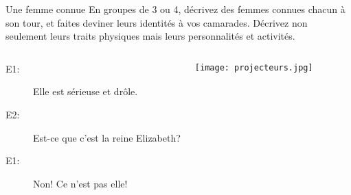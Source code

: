 \documentclass{beamer}
\begin{document}
  \begin{frame}{Une femme connue}
    En groupes de 3 ou 4, décrivez des femmes connues chacun à son tour, et faites deviner leurs identités à vos camarades. Décrivez non seulement leurs traits physiques mais leurs personnalités et activités. \\
    \begin{columns}
        \begin{description}
          \item[E1:] Elle est sérieuse et drôle.
          \item[] 
          \item[E2:] Est-ce que c'est la reine Elizabeth?
          \item[] 
          \item[E1:] Non! Ce n'est pas elle!
          \item[] 
        \end{description}
        \begin{center}
          \texttt{[image: projecteurs.jpg]}
        \end{center}
    \end{columns}
  \end{frame}
\end{document}

